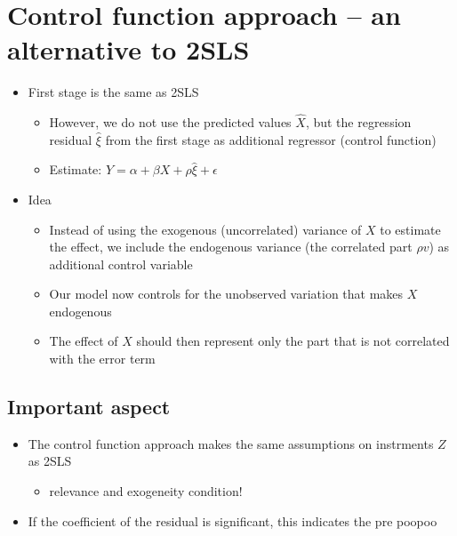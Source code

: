 \documentclass[10pt]{article}
\begin{document}
\section{Control function approach -- an alternative to 2SLS}
\begin{itemize}
    \item First stage is the same as 2SLS 
    \begin{itemize}
        \item However, we do not use the predicted values $\hat{X} $, but the regression residual $\hat{\xi} $ from the first stage as additional regressor (control function)
        \item Estimate: $Y = \alpha + \beta X + \rho\hat{\xi} + \epsilon $ 
    \end{itemize}
    \item Idea
    \begin{itemize}
        \item Instead of using the exogenous (uncorrelated) variance of $X $ to estimate the effect, we include the endogenous variance (the correlated part $\rho v $) as additional control variable
        \item Our model now controls for the unobserved variation that makes $X $ endogenous
        \item The effect of $X $ should then represent only the part that is not correlated with the error term 
    \end{itemize}
\end{itemize}
\subsection{Important aspect}
\begin{itemize}
    \item The control function approach makes the same assumptions on instrments $Z $ as 2SLS 
    \begin{itemize}
        \item relevance and exogeneity condition!
    \end{itemize}
    \item If the coefficient of the residual is significant, this indicates the pre poopoo
\end{itemize}
\end{document}
